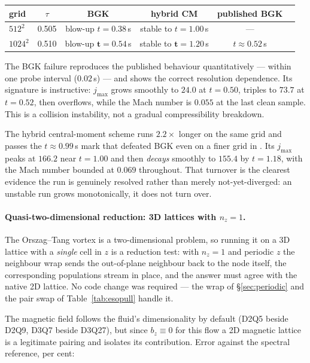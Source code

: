 \documentclass[11pt,a4paper]{article}
\begin{document}
\begin{center}\small
\begin{tabular}{lccccc}
\toprule
grid & $\tau$ & BGK & hybrid CM & published BGK \\
\midrule
$512^2$  & 0.505 & blow-up $t=0.38$\,s & stable to $t=1.00$\,s & --- \\
$1024^2$ & 0.510 & blow-up $\bm{t=0.54}$\,s & stable to $\bm{t=1.20}$\,s & $t\approx0.52$\,s \\
\bottomrule
\end{tabular}
\end{center}

The BGK failure reproduces the published behaviour quantitatively --- within one
probe interval ($0.02$\,s) --- and shows the correct resolution dependence. Its
signature is instructive: $j_{\max}$ grows smoothly to $24.0$ at $t=0.50$, triples
to $73.7$ at $t=0.52$, then overflows, while the Mach number is $0.055$ at the
last clean sample. This is a collision instability, not a gradual compressibility
breakdown.

The hybrid central-moment scheme runs $2.2\times$ longer on the same grid and
passes the $t\approx0.99$\,s mark that defeated BGK even on a finer grid in
\cite{derosis2018}. Its $j_{\max}$ peaks at $166.2$ near $t=1.00$ and then
\emph{decays} smoothly to $155.4$ by $t=1.18$, with the Mach number bounded at
$0.069$ throughout. That turnover is the clearest evidence the run is genuinely
resolved rather than merely not-yet-diverged: an unstable run grows
monotonically, it does not turn over.

\paragraph{Quasi-two-dimensional reduction: 3D lattices with $n_z=1$.}
\label{sec:reduction}

The Orszag--Tang vortex is a two-dimensional problem, so running it on a 3D
lattice with a \emph{single} cell in $z$ is a reduction test: with $n_z=1$ and
periodic $z$ the neighbour wrap sends the out-of-plane neighbour back to the node
itself, the corresponding populations stream in place, and the answer must agree
with the native 2D lattice. No code change was required --- the wrap of
\S\ref{sec:periodic} and the pair swap of Table~\ref{tab:esopull} handle it.

The magnetic field follows the fluid's dimensionality by default (D2Q5 beside
D2Q9, D3Q7 beside D3Q27), but since $b_z\equiv0$ for this flow a 2D
magnetic lattice is a legitimate pairing and isolates its contribution.
Error against the spectral reference, per cent:
\end{document}
